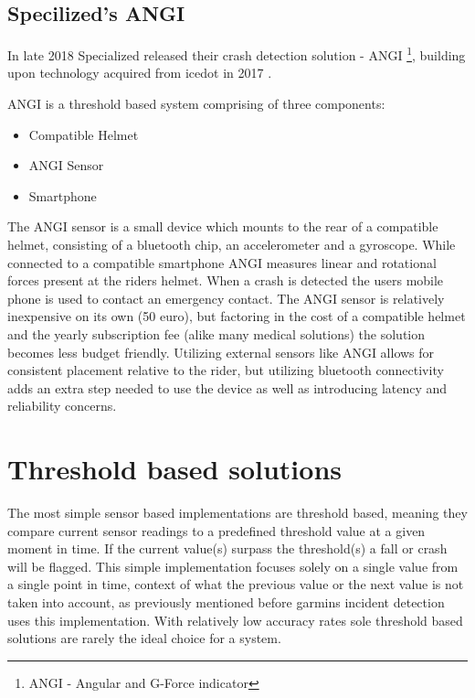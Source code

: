 \subsection{Specilized's ANGI}

In late 2018 Specialized released their crash detection solution - ANGI \footnote{ ANGI - Angular and G-Force indicator}, \cite {ANGI} building upon technology acquired from icedot in 2017 \cite{icedot}. 

ANGI is a threshold based system comprising of three components:
\vspace{1cm}
\begin{itemize}
\item Compatible Helmet
\item ANGI Sensor
\item Smartphone
\end{itemize}

The ANGI sensor is a small device which mounts to the rear of  a compatible helmet, consisting of a bluetooth chip, an accelerometer and a gyroscope. While connected to a compatible smartphone ANGI measures linear and rotational forces present at the riders helmet. When a crash is detected the users mobile phone is used to contact an emergency contact. The ANGI sensor is relatively inexpensive on its own (50 euro), but factoring in the cost of a compatible helmet and the yearly subscription fee (alike many medical solutions) the solution becomes less budget friendly. Utilizing external sensors like ANGI allows for consistent placement relative to the rider, but utilizing bluetooth connectivity adds an extra step needed to use the device as well as introducing latency and reliability concerns.


\section{Threshold based solutions} \label{tbs}
The most simple sensor based implementations are threshold based, meaning they compare current sensor readings to a predefined threshold value at a given moment in time. If the current value(s) surpass the threshold(s) a fall or crash will be flagged. This simple implementation focuses solely on a single value from a single point in time, context of what the previous value or the next value is not taken into account, as previously mentioned before garmins incident detection uses this implementation. With relatively low accuracy rates sole threshold based solutions are rarely the ideal choice for a system.

